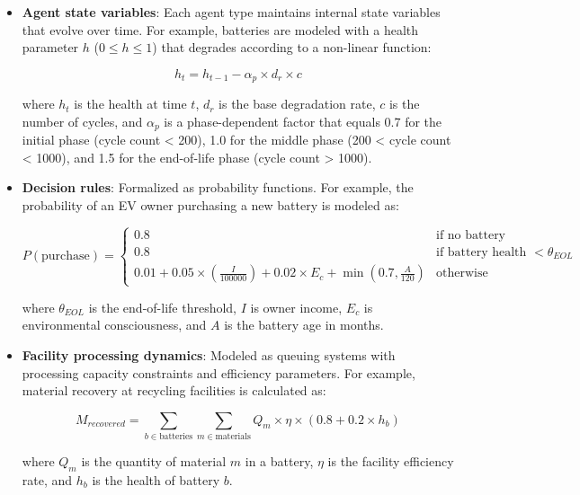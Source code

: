 \begin{itemize}
  \item \textbf{Agent state variables}: Each agent type maintains internal state variables that evolve over time. For example, batteries are modeled with a health parameter $h$ ($0 \leq h \leq 1$) that degrades according to a non-linear function:
  
  \begin{equation}
  h_t = h_{t-1} - \alpha_p \times d_r \times c
  \end{equation}
  
  where $h_t$ is the health at time $t$, $d_r$ is the base degradation rate, $c$ is the number of cycles, and $\alpha_p$ is a phase-dependent factor that equals 0.7 for the initial phase (cycle count < 200), 1.0 for the middle phase (200 < cycle count < 1000), and 1.5 for the end-of-life phase (cycle count > 1000).
  
  \item \textbf{Decision rules}: Formalized as probability functions. For example, the probability of an EV owner purchasing a new battery is modeled as:
  
  \begin{equation}
  P(\text{purchase}) = \begin{cases} 
  0.8 & \text{if no battery} \\
  0.8 & \text{if battery health } < \theta_{EOL} \\
  0.01 + 0.05 \times (\frac{I}{100000}) + 0.02 \times E_c + \min(0.7, \frac{A}{120}) & \text{otherwise}
  \end{cases}
  \end{equation}
  
  where $\theta_{EOL}$ is the end-of-life threshold, $I$ is owner income, $E_c$ is environmental consciousness, and $A$ is the battery age in months.
  
  \item \textbf{Facility processing dynamics}: Modeled as queuing systems with processing capacity constraints and efficiency parameters. For example, material recovery at recycling facilities is calculated as:
  
  \begin{equation}
  M_{recovered} = \sum_{b \in \text{batteries}} \sum_{m \in \text{materials}} Q_m \times \eta \times (0.8 + 0.2 \times h_b)
  \end{equation}
  
  where $Q_m$ is the quantity of material $m$ in a battery, $\eta$ is the facility efficiency rate, and $h_b$ is the health of battery $b$.
\end{itemize}

